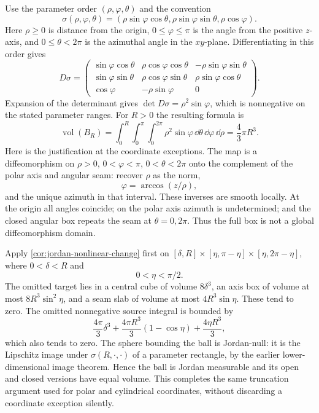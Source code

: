 \begin{example}\label{ex:spherical-ball}
Use the parameter order $(\rho,\varphi,\theta)$ and the convention
\[
\sigma(\rho,\varphi,\theta)=
(\rho\sin\varphi\cos\theta,\rho\sin\varphi\sin\theta,\rho\cos\varphi).
\]
Here $\rho\geq0$ is distance from the origin, $0\leq\varphi\leq\pi$
is the angle from the positive $z$-axis, and $0\leq\theta<2\pi$ is
the azimuthal angle in the $xy$-plane. Differentiating in this order gives
\[
D\sigma=\begin{pmatrix}
\sin\varphi\cos\theta&\rho\cos\varphi\cos\theta&-\rho\sin\varphi\sin\theta\\
\sin\varphi\sin\theta&\rho\cos\varphi\sin\theta&\rho\sin\varphi\cos\theta\\
\cos\varphi&-\rho\sin\varphi&0
\end{pmatrix}.
\]
Expansion of the determinant gives $\det D\sigma=\rho^2\sin\varphi$,
which is nonnegative on the stated parameter ranges.
For $R>0$ the resulting formula is
\[
\operatorname{vol}(B_R)=\int_0^R\int_0^\pi\int_0^{2\pi}
\rho^2\sin\varphi\,\dd\theta\,\dd\varphi\,\dd\rho
=\frac43\pi R^3.
\]
Here is the justification at the coordinate exceptions. The map is a
diffeomorphism on $\rho>0$, $0<\varphi<\pi$, $0<\theta<2\pi$ onto
the complement of the polar axis and angular seam: recover $\rho$ as
the norm,
\[
\varphi=\arccos(z/\rho),
\]
 and the unique azimuth in that interval.
These inverses are smooth locally. At the origin all angles coincide;
on the polar axis azimuth is undetermined; and the closed angular box
repeats the seam at $\theta=0,2\pi$. Thus the full box is not a global
diffeomorphism domain.

Apply \cref{cor:jordan-nonlinear-change} first on
$[\delta,R]\times[\eta,\pi-\eta]\times[\eta,2\pi-\eta]$,
where $0<\delta<R$ and
\[
0<\eta<\pi/2.
\]
 The omitted target lies in
a central cube of volume $8\delta^3$, an axis box of volume at most
$8R^3\sin^2\eta$, and a seam slab of volume at most $4R^3\sin\eta$.
These tend to zero. The omitted nonnegative source integral is bounded by
\[
\frac{4\pi}{3}\delta^3+
\frac{4\pi R^3}{3}(1-\cos\eta)+\frac{4\eta R^3}{3},
\]
which also tends to zero. The sphere bounding the ball is Jordan-null:
it is the Lipschitz image under $\sigma(R,\cdot,\cdot)$ of a parameter
rectangle, by the earlier lower-dimensional image theorem. Hence the
ball is Jordan measurable and its open and closed versions have equal
volume. This completes the same truncation argument used for polar and
cylindrical coordinates, without discarding a coordinate exception silently.
\end{example}
